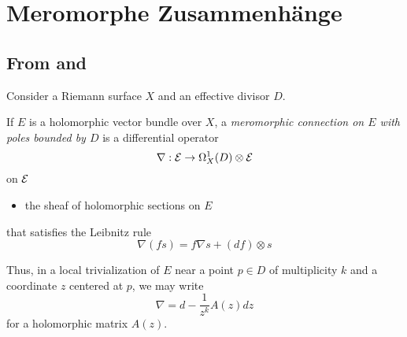 \chapter{Meromorphe Zusammenhänge}
\begin{comment}
  Siehe:
  \begin{itemize}
    \item \cite{boalch} and \cite{thboalch}
    \item \cite{sabbah2007isomonodromic}
  \end{itemize}
  and
  \begin{itemize}
    \item \cite{Varadarajan96linearmeromorphic}
  \end{itemize}
\end{comment}

\section{From \cite{thpym} and \cite{citeulike:12387686}}
Consider a Riemann surface $X$ and an effective divisor $D$.
\begin{defn}
  If $E$ is a holomorphic vector bundle over $X$, a \emph{meromorphic connection
  on $E$ with poles bounded by $D$} is a differential operator
  \[
    \nabla:\mathcal{E}\to\Omega_X^1(D)\otimes\mathcal{E}
  \]
  on $\mathcal{E}$
  \begin{itemize}
    \item the sheaf of holomorphic sections on $E$
  \end{itemize}
  that satisfies the Leibnitz rule
  \[
    \nabla(fs)=f\nabla s + (df)\otimes s
  \]
  \begin{rem}
    Thus, in a local trivialization of $E$ near a point $p\in D$ of
    multiplicity $k$ and a coordinate $z$ centered at $p$, we may write
    \[
      \nabla=d-\frac{1}{z^k}A(z)dz
    \]
    for a holomorphic matrix $A(z)$.
  \end{rem}
\end{defn}

